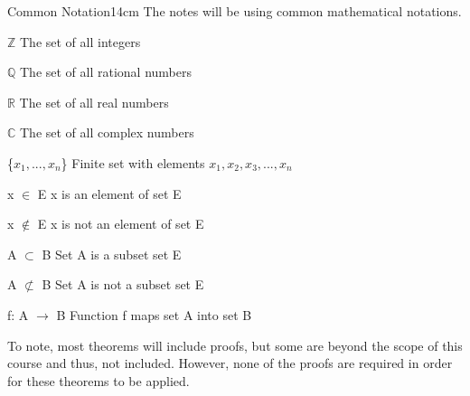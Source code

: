 \newpage

    \begin{definition}{Common Notation}{14cm}
        The notes will be using common mathematical notations.

        \hspace{0.5cm}
        $\mathbb{Z}$
        \hspace{3cm}
        The set of all integers

        \hspace{0.5cm}
        $\mathbb{Q}$
        \hspace{3cm}
        The set of all rational numbers

        \hspace{0.5cm}
        $\mathbb{R}$
        \hspace{3cm}
        The set of all real numbers

        \hspace{0.5cm}
        $\mathbb{C}$
        \hspace{3cm}
        The set of all complex numbers

        \hspace{0.5cm}
        \{$x_1,...,x_n$\}
        \hspace{1.35cm}
        Finite set with elements $x_1,x_2,x_3,...,x_n$

        \hspace{0.5cm}
        x $\in$ E
        \hspace{2.3cm}
        x is an element of set E

        \hspace{0.5cm}
        x $\not \in$ E
        \hspace{2.3cm}
        x is not an element of set E

        \hspace{0.5cm}
        A $\subset$ B
        \hspace{2.2cm}
        Set A is a subset set E

        \hspace{0.5cm}
        A $\not \subset$ B
        \hspace{2.2cm}
        Set A is not a subset set E

        \hspace{0.5cm}
        f: A $\rightarrow$ B
        \hspace{1.7cm}
        Function f maps set A into set B

        To note, most theorems will include proofs, but some are
        beyond the scope of this course and thus, not included.
        However, none of the proofs are required in order for
        these theorems to be applied.
    \end{definition}



